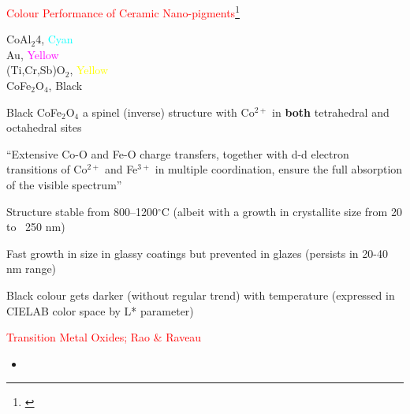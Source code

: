 \documentclass[landscape]{slides}
\begin{document}
	\begin{slide}
	\textcolor{red}{\Large{Colour Performance of Ceramic Nano-pigments}}\footnote{\cite{Cavalcante2009}}
	\begin{itemize}
		
		\small{\item CoAl$_2$4, \textcolor{cyan}{Cyan}
		\\Au, \textcolor{magenta}{Yellow} \\(Ti,Cr,Sb)O$_2$, \textcolor{yellow}{Yellow}
\\CoFe$_2$O$_4$, Black}
	
	\item Black CoFe$_2$O$_4$ a spinel (inverse) structure with Co$^{2+}$ in \textbf{both} tetrahedral and octahedral sites 
	
	\item ``Extensive Co-O and Fe-O charge
	transfers, together with d-d electron transitions of Co$^{2+}$ and Fe$^{3+}$ in multiple coordination,
	ensure the full absorption of the visible spectrum''
	
	\item Structure stable from 800--1200$^\circ$C (albeit with a growth in crystallite size from 20 to ~250 nm)
	
	\item Fast growth in size in glassy coatings but prevented in glazes (persists in 20-40 nm range)
	
	\item Black colour gets darker (without regular trend) with temperature (expressed in CIELAB color space by L* parameter)
\end{itemize}
	\end{slide}

\begin{slide}
	\textcolor{red}{\Large{Transition Metal Oxides; Rao \& Raveau}}
	\begin{itemize}
		\item 
	\end{itemize}
\end{slide}
\end{document}
